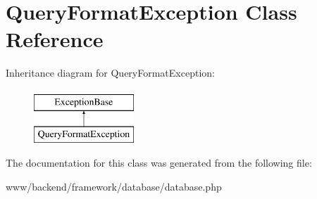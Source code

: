 \hypertarget{classQueryFormatException}{
\section{QueryFormatException Class Reference}
\label{classQueryFormatException}
}
Inheritance diagram for QueryFormatException:\begin{figure}[H]
\begin{center}
\leavevmode
\includegraphics[height=2.000000cm]{classQueryFormatException}
\end{center}
\end{figure}


The documentation for this class was generated from the following file:\begin{DoxyCompactItemize}
\item 
www/backend/framework/database/database.php\end{DoxyCompactItemize}
